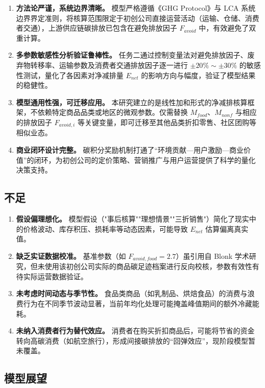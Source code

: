 \documentclass{article}
\begin{document}
\begin{enumerate}
    \item \textbf{方法论严谨，系统边界清晰。} 模型严格遵循《GHG Protocol》与 LCA 系统边界界定准则，将核算范围限定于初创公司直接运营活动（运输、仓储、消费者交通），上游供应链碳排放已包含在避免排放因子 $F_{avoid}$ 中，有效避免了双重计算。
    \item \textbf{多参数敏感性分析验证鲁棒性。} 任务二通过控制变量法对避免排放因子、废弃物转移率、运输参数及消费者交通排放因子逐一进行 $\pm20\%\sim\pm30\%$ 的敏感性测试，量化了各因素对净减排量 $E_{net}$ 的影响方向与幅度，验证了模型结果的稳健性。
    \item \textbf{模型通用性强，可迁移应用。} 本研究建立的是线性加和形式的净减排核算框架，不依赖特定商品品类或地区的微观参数。仅需替换 $M_{food}$、$M_{nonf}$ 与相应的排放因子 $F_{avoid,i}$ 等关键变量，即可迁移至其他品类折扣零售、社区团购等相似业态。
    \item \textbf{商业闭环设计完整。} 碳积分奖励机制打通了“环境贡献—用户激励—商业价值”的闭环，为初创公司的定价策略、营销推广与用户运营提供了科学的量化决策支持。
\end{enumerate}

\subsection{不足}

\begin{enumerate}
    \item \textbf{假设偏理想化。} 模型假设（"事后核算""理想情景""三折销售"）简化了现实中的价格波动、库存积压、损耗率等动态因素，可能导致 $E_{net}$ 估算偏离真实值。
    \item \textbf{缺乏实证数据校准。} 基准参数（如 $F_{avoid,food}=2.7$）虽引用自 Blonk 学术研究，但未使用该初创公司实际的商品碳足迹档案进行反向校核，参数有效性有待实际运营数据验证。
    \item \textbf{未考虑时间动态与季节性。} 食品类商品（如乳制品、烘焙食品）的消费与浪费行为在不同季节波动显著，当前年均化处理可能掩盖峰值期间的额外冷藏能耗。
    \item \textbf{未纳入消费者行为替代效应。} 消费者在购买折扣商品后，可能将节省的资金转向高碳消费（如航空旅行），形成间接碳排放的“回弹效应”，现阶段模型暂未覆盖。
\end{enumerate}

\subsection{模型展望}
\end{document}
